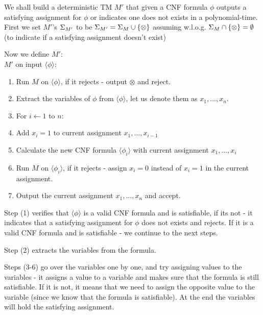 We shall build a deterministic TM $M'$ that given a CNF formula $\phi$ outputs a satisfying
assignment for $\phi$ or indicates one does not exists in a polynomial-time. \\
First we set $M'$'s $\Sigma_{M'}$ to be $\Sigma_{M'}=\Sigma_{M} \cup \{\otimes\}$ assuming w.l.o.g.
$\Sigma_{M} \cap \{\otimes\} = \emptyset$ (to indicate if a satisfying assignment doesn't exist)

\pagebreak

Now we define $M'$: \\
$M'$ on input $\langle \phi \rangle$:
\begin{enumerate}[1., itemsep=5pt]

    \item Run $M$ on $\langle \phi \rangle$, if it rejects - output $\otimes$ and reject.

    \item Extract the variables of $\phi$ from $\langle \phi \rangle$, let us denote them as $x_1,...,x_n$.

    \item For $i \leftarrow 1$ to $n$:
    \item \qquad Add $x_i = 1$ to current assignment $x_1,...,x_{i-1}$
    \item \qquad Calculate the new CNF formula $\langle \phi_i \rangle$ with current assignment $x_1,...,x_i$
    \item \qquad Run $M$ on $\langle \phi_i \rangle$, if it rejects - assign $x_i = 0$ instead of $x_i = 1$ in the current assignment.

    \item Output the current assignment $x_1,...,x_n$ and accept.

\end{enumerate}


Step (1) verifies that $\langle \phi \rangle$ is a valid CNF formula and is satisfiable, if its not - it indicates that a satisfying
assignment for $\phi$ does not exists and rejects. If it is a valid CNF formula and is satisfiable - we continue to the next steps.

Step (2) extracts the variables from the formula.

Steps (3-6) go over the variables one by one, and try assigning values to the variables - it assigns a value to a variable and makes
sure that the formula is still satisfiable. If it is not, it means that we need to assign the opposite value to the variable
(since we know that the formula is satisfiable). At the end the variables will hold the satisfying assignment.

